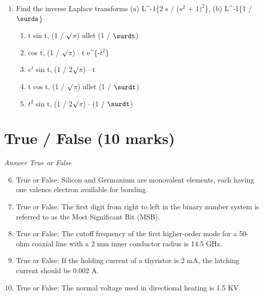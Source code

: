 \documentclass[12pt]{article}
\begin{document}
\begin{enumerate}[label=\arabic*.]
\begin{enumerate}[label=(\alph*)]
    \item 1 cos $10^6$ t
    \item 10^-3 cos $10^6$ t
    \item 0.01 sin $10^6$ t
\end{enumerate}
\item Find the inverse Laplace transforms (a) L^-1\{2 s / ($s^2$ + $1)^2$\}, (b) L^-1\{1 / \ensuremath{\surds}\}
\begin{enumerate}[label=(\alph*)]
    \item t sin t, (1 / \ensuremath{\surd}\ensuremath{\pi}) ullet (1 / \ensuremath{\surdt})
    \item cos t, (1 / \ensuremath{\surd}\ensuremath{\pi}) \ensuremath{\cdot} t e^\{-$t^2$\}
    \item $e^t$ sin t, (1 / 2\ensuremath{\surd}\ensuremath{\pi}) \ensuremath{\cdot} t
    \item t cos t, (1 / \ensuremath{\surd}\ensuremath{\pi}) ullet (1 / \ensuremath{\surdt})
    \item $t^2$ sin t, (1 / 2\ensuremath{\surd}\ensuremath{\pi}) \ensuremath{\cdot} (1 / \ensuremath{\surdt})
\end{enumerate}
\end{enumerate}

\section*{True / False (10 marks)}
\textit{Answer True or False}
\begin{enumerate}[label=\arabic*.]
\setcounter{enumi}{5}
\item True or False: Silicon and Germanium are monovalent elements, each having one valence electron available for bonding.
\item True or False: The first digit from right to left in the binary number system is referred to as the Most Significant Bit (MSB).
\item True or False: The cutoff frequency of the first higher-order mode for a 50-ohm coaxial line with a 2 mm inner conductor radius is 14.5 GHz.
\item True or False: If the holding current of a thyristor is 2 mA, the latching current should be 0.002 A.
\item True or False: The normal voltage used in directional heating is 1.5 KV.
\end{enumerate}
\end{document}
